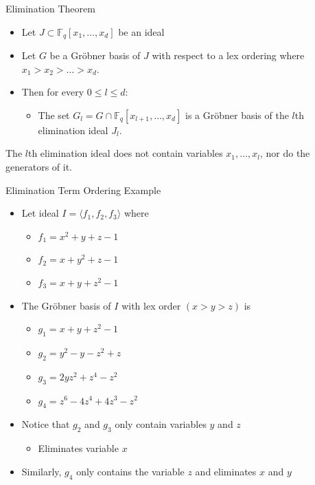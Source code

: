 \documentclass[xcolor=dvipsnames]{beamer}
\newcommand{\Fq}{{\mathbb{F}}_{q}}
\newcommand{\Grobner}{Gr\"{o}bner\xspace}
\begin{document}


\begin{frame}{\large {Elimination Theorem}}
\begin{itemize}
\item Let $J \subset \Fq[x_1,\dots,x_d]$ be an ideal
\end{itemize}
\begin{itemize}
\item Let $G$ be a \Grobner basis of $J$ with respect to a lex ordering where $x_1
> x_2 > \dots > x_d$.
\end{itemize}
\begin{itemize}
\item Then for every $0 \leq l \leq d$:
	\begin{itemize}	
	\item The set $G_l= G \cap \Fq[x_{l+1},\dots,x_d]$ is a Gr\"obner basis of the $l$th elimination ideal $J_l$.
	\end{itemize}
\end{itemize}

The $l$th elimination ideal does not contain variables
$x_1,\dots,x_l$, nor do the generators of it.

\end{frame}


\begin{frame}{\large {Elimination Term Ordering Example}}
\begin{itemize}
\item Let ideal $I = \langle f_1, f_2, f_3 \rangle$ where
	\begin{itemize}
	\item $f_1 = x^2 + y + z - 1$
	\item $f_2 = x + y^2 + z - 1$
	\item $f_3 = x + y + z^2 - 1$
	\end{itemize}
\item The \Grobner basis of $I$ with lex order $(x > y > z)$ is
	\begin{itemize}
	\item $g_1 = x + y + z^2 - 1$
	\item $g_2 = y^2 - y - z^2 + z$
	\item $g_3 = 2yz^2 + z^4 - z^2$
	\item $g_4 = z^6 - 4z^4 + 4z^3 - z^2$
	\end{itemize}
\item Notice that $g_2$ and $g_3$ only contain variables $y$ and $z$
	\begin{itemize}
	\item Eliminates variable $x$
	\end{itemize}
\item Similarly, $g_4$ only contains the variable $z$ and eliminates $x$ and $y$
\end{itemize}
\end{frame}
\end{document}
